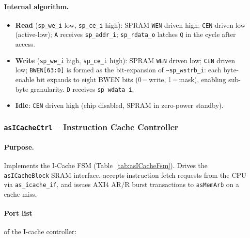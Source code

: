 \paragraph{Internal algorithm.}
\begin{itemize}
  \item \textbf{Read} (\texttt{sp\_we\_i} low, \texttt{sp\_ce\_i} high):
    SPRAM \texttt{WEN} driven high; \texttt{CEN} driven low (active-low);
    \texttt{A} receives \texttt{sp\_addr\_i};
    \texttt{sp\_rdata\_o} latches \texttt{Q} in the cycle after access.
  \item \textbf{Write} (\texttt{sp\_we\_i} high, \texttt{sp\_ce\_i} high):
    SPRAM \texttt{WEN} driven low; \texttt{CEN} driven low;
    \texttt{BWEN[63:0]} is formed as the bit-expansion of
    \texttt{\textasciitilde sp\_wstrb\_i}: each byte-enable bit expands to
    eight BWEN bits (0\,=\,write, 1\,=\,mask), enabling sub-byte
    granularity.
    \texttt{D} receives \texttt{sp\_wdata\_i}.
  \item \textbf{Idle}: \texttt{CEN} driven high (chip disabled, SPRAM
    in zero-power standby).
\end{itemize}

\subsubsection{\texttt{asICacheCtrl} -- Instruction Cache Controller}
\label{subsubsec:asICacheCtrl}

\paragraph{Purpose.}
Implements the I-Cache FSM (Table~\ref{tab:asICacheFsm}).
Drives the \texttt{asICacheBlock} SRAM interface, accepts instruction
fetch requests from the CPU via \texttt{as\_icache\_if}, and issues
AXI4 AR/R burst transactions to \texttt{asMemArb} on a cache miss.

\paragraph{Port list} of the I-cache controller:

